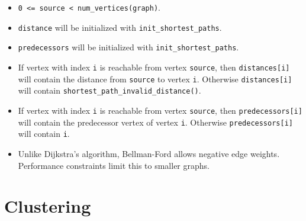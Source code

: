 \begin{itemdescr}
      \pnum\preconditions
            \begin{itemize}
                  \item
                        \lstinline{0 <= source < num_vertices(graph)}. 
                  \item
                        \lstinline{distance} will be initialized with \lstinline{init_shortest_paths}.
                  \item
                        \lstinline{predecessors} will be initialized with \lstinline{init_shortest_paths}.
            \end{itemize}
      \pnum\effects
            \begin{itemize}
                  \item
                        If vertex with index \lstinline{i} is reachable from vertex \lstinline{source}, then
                        \lstinline{distances[i]} will contain the distance from \lstinline{source} to vertex
                        \lstinline{i}.  Otherwise \lstinline{distances[i]} will contain
                        \lstinline{shortest_path_invalid_distance()}.
                  \item
                        If vertex with index \lstinline{i} is reachable
                        from vertex \lstinline{source}, then \lstinline{predecessors[i]} will contain the
                        predecessor vertex of vertex \lstinline{i}. Otherwise \lstinline{predecessors[i]} will contain
                        \lstinline{i}.
            \end{itemize}
      \pnum\remarks 
            \begin{itemize}
                  \item
                        Unlike Dijkstra's algorithm, Bellman-Ford allows negative edge weights. Performance constraints limit this to smaller graphs.
            \end{itemize}
\end{itemdescr}


\section{Clustering}
